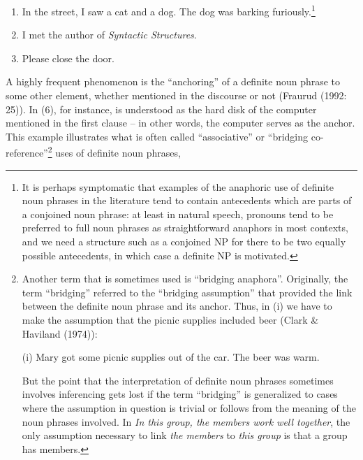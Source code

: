 \begin{enumerate} %
\item 
\clearpage%
\label{bkm:Ref93745057}In the street, I saw a cat and a dog. The dog was barking furiously.\footnote{ It is perhaps symptomatic that examples of the anaphoric use of definite noun phrases in the literature tend to contain antecedents which are parts of a conjoined noun phrase: at least in natural speech, pronouns tend to be preferred to full noun phrases as straightforward anaphors in most contexts, and we need a structure such as a conjoined NP for there to be two equally possible antecedents, in which case a definite NP is motivated.}

\item 
\label{bkm:Ref93745078}I met the author of \textit{Syntactic Structures}. 
\item 
\label{bkm:Ref93745091}Please close the door.

\end{enumerate} %
A highly frequent phenomenon is the “anchoring” of a definite noun phrase to some other element, whether mentioned in the discourse or not (Fraurud (1992: 25)). In (6), for instance,  is understood as the hard disk of the computer mentioned in the first clause – in other words, the computer serves as the anchor.  This example illustrates what is often called “associative” or “bridging co-reference”\footnote{ Another term that is sometimes used is “bridging anaphora”. Originally, the term “bridging” referred to the “bridging assumption” that provided the link between the definite noun phrase and its anchor. Thus, in (i) we have to make the assumption that the picnic supplies included beer (Clark \& Haviland (1974)):\par (i) Mary got some picnic supplies out of the car. The beer was warm. \par But the point that the interpretation of definite noun phrases sometimes involves inferencing gets lost if the term “bridging” is generalized to cases where the assumption in question is trivial or follows from the meaning of the noun phrases involved. In \textit{In this group, the members work well together}, the only assumption necessary to link \textit{the members} to \textit{this group} is that a group has members. } uses of definite noun phrases,

